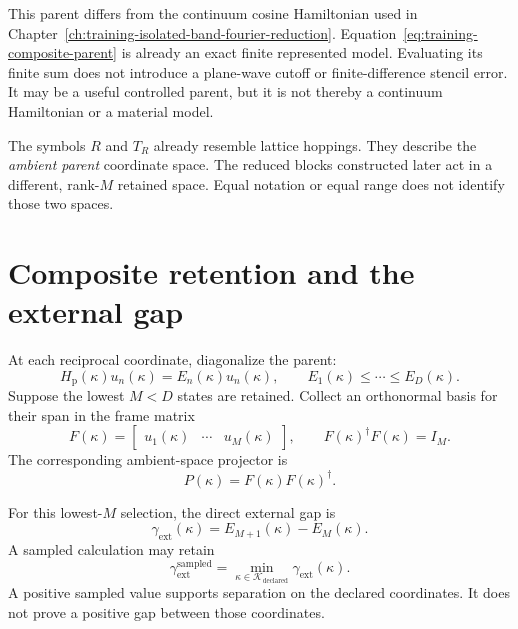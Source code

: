 This parent differs from the continuum cosine Hamiltonian used in
Chapter~\ref{ch:training-isolated-band-fourier-reduction}. Equation~\eqref{eq:training-composite-parent}
is already an exact finite represented model. Evaluating its finite sum does
not introduce a plane-wave cutoff or finite-difference stencil error. It may be
a useful controlled parent, but it is not thereby a continuum Hamiltonian or a
material model.

The symbols $R$ and $T_R$ already resemble lattice hoppings. They describe the
\emph{ambient parent} coordinate space. The reduced blocks constructed later
act in a different, rank-$M$ retained space. Equal notation or equal range does
not identify those two spaces.

\section{Composite retention and the external gap}

At each reciprocal coordinate, diagonalize the parent:
\begin{equation}
  H_{\mathrm p}(\kappa)u_n(\kappa)
  =E_n(\kappa)u_n(\kappa),
  \qquad
  E_1(\kappa)\leq\cdots\leq E_D(\kappa).
  \label{eq:training-composite-eigensystem}
\end{equation}
Suppose the lowest $M<D$ states are retained. Collect an orthonormal basis for
their span in the frame matrix
\begin{equation}
  F(\kappa)
  =\begin{bmatrix}u_1(\kappa)&\cdots&u_M(\kappa)\end{bmatrix},
  \qquad
  F(\kappa)^{\dagger}F(\kappa)=I_M.
  \label{eq:training-composite-frame}
\end{equation}
The corresponding ambient-space projector is
\begin{equation}
  P(\kappa)=F(\kappa)F(\kappa)^{\dagger}.
  \label{eq:training-composite-projector}
\end{equation}

For this lowest-$M$ selection, the direct external gap is
\begin{equation}
  \gamma_{\mathrm{ext}}(\kappa)
  =E_{M+1}(\kappa)-E_M(\kappa).
  \label{eq:training-composite-external-gap}
\end{equation}
A sampled calculation may retain
\begin{equation}
  \gamma_{\mathrm{ext}}^{\mathrm{sampled}}
  =\min_{\kappa\in\mathcal K_{\mathrm{declared}}}
   \gamma_{\mathrm{ext}}(\kappa).
  \label{eq:training-composite-sampled-gap}
\end{equation}
A positive sampled value supports separation on the declared coordinates. It
does not prove a positive gap between those coordinates.


